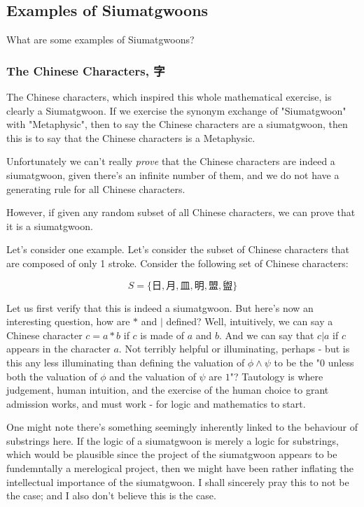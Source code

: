 \subsection{Examples of Siumatgwoons}

What are some examples of Siumatgwoons? 



\subsubsection{The Chinese Characters, 字}

The Chinese characters, which inspired this whole mathematical exercise, is clearly a Siumatgwoon. If we exercise the synonym exchange of "Siumatgwoon" with "Metaphysic", then to say the Chinese characters are a siumatgwoon, then this is to say that the Chinese characters is a Metaphysic. 

Unfortunately we can't really \textit{prove} that the Chinese characters are indeed a siumatgwoon, given there's an infinite number of them, and we do not have a generating rule for all Chinese characters. 

However, if given any random subset of all Chinese characters, we can prove that it is a siumatgwoon. 

Let's consider one example. Let's consider the subset of Chinese characters that are composed of only 1 stroke. Consider the following set of Chinese characters: 

$$S=\{\text{日},\text{月}  ,\text{皿},\text{明},\text{盟},\text{盥}\}$$

Let us first verify that this is indeed a siumatgwoon. But here's now an interesting question, how are $*$ and $|$ defined? Well, intuitively, we can say a Chinese character $c = a *b$ if $c$ is made of $a$ and $b$. And we can say that $c|a$ if $c$ appears in the character $a$. Not terribly helpful or illuminating, perhaps - but is this any less illuminating than defining the valuation of $\phi \wedge \psi$ to be the "$0$ unless both the valuation of $\phi$ and the valuation of $\psi$ are $1$"? Tautology is where judgement, human intuition, and the exercise of the human choice to grant admission works, and must work - for logic and mathematics to start. 

One might note there's something seemingly inherently linked to the behaviour of substrings here. If the logic of a siumatgwoon is merely a logic for substrings, which would be plausible since the project of the siumatgwoon appears to be fundemntally a merelogical project, then we might have been rather inflating the intellectual importance of the siumatgwoon. I shall sincerely pray this to not be the case; and I also don't believe this is the case.

